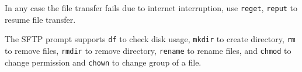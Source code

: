 In any case the file transfer fails due to internet interruption, use \verb|reget|, \verb|reput| to resume file transfer.

The SFTP prompt supports \verb|df| to check disk usage, \verb|mkdir| to create directory, \verb|rm| to remove files, \verb|rmdir| to remove directory, \verb|rename| to rename files, and \verb|chmod| to change permission and \verb|chown| to change group of a file.
 










